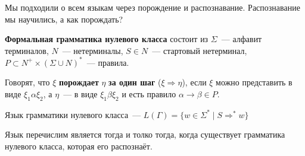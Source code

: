 \documentclass{article}
\begin{document}
    \begin{remark}
        Мы подходили о всем языкам через порождение и распознавание. Распознавание мы научились, а как порождать?
    \end{remark}
    \begin{definition}
        \textbf{Формальная грамматика нулевого класса} состоит из
        $\Sigma$~--- алфавит терминалов, $N$~--- нетерминалы, $S\in N$~--- стартовый нетерминал, $P\subset N^+\times(\Sigma\cup N)^*$~--- правила.
    \end{definition}
    \begin{definition}
        Говорят, что $\xi$ \textbf{порождает} $\eta$ \textbf{за один шаг} ($\xi\Rightarrow\eta$), если $\xi$ можно представить в виде $\xi_1\alpha\xi_2$, а $\eta$~--- в виде $\xi_1\beta\xi_2$ и есть правило $\alpha\to\beta\in P$.
    \end{definition}
    \begin{definition}
        Язык грамматики нулевого класса~--- $L(\Gamma)=\{w\in\Sigma^*\mid S\Rightarrow^*w\}$
    \end{definition}
    \begin{claim}
        Язык перечислим является тогда и толко тогда, когда существует грамматика нулевого класса, которая его распознаёт.
    \end{claim}
\end{document}
